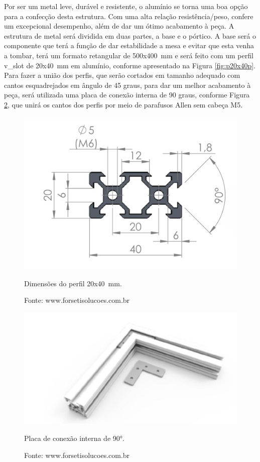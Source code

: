 Por ser um metal leve, durável e resistente, o alumínio se torna uma boa opção para a confecção desta 
estrutura. Com uma alta relação resistência/peso, confere um excepcional desempenho, além de dar um ótimo 
acabamento à peça. A estrutura de metal será dividida em duas partes, a base e o pórtico. A base será 
o componente que terá a função de dar estabilidade a mesa e evitar que esta venha a tombar, terá um 
formato retangular de 500x400~mm e será feito com um perfil v\_slot de 20x40~mm em alumínio, conforme 
apresentado na Figura \ref{fig:p20x40p}. 
Para fazer a união dos perfis, que serão cortados em tamanho adequado com cantos esquadrejados em 
ângulo de 45 graus, para dar um melhor acabamento à peça, será utilizada uma placa de conexão 
interna de 90 graus, conforme Figura \ref{fig:pconexao90p}, que unirá os cantos dos perfis por 
meio de parafusos Allen sem cabeça M5.
    
\begin{figure}[H]
\centering
\includegraphics[width = 0.7\linewidth]{figuras/p20x40d}
\caption{Dimensões do perfil 20x40~mm.}
\caption*{Fonte: www.forsetisolucoes.com.br}
\label{fig:p20x40d}
\end{figure}
    
\begin{figure}[H]
\centering
\includegraphics[width = 0.5\linewidth]{figuras/pconexao90p}
\caption{Placa de conexão interna de 90°.}
\caption*{Fonte: www.forsetisolucoes.com.br}
\label{fig:pconexao90p}
\end{figure}
    
